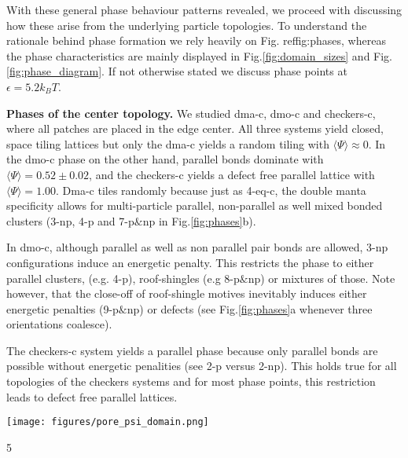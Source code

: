 \documentclass[a4paper,twocolumn]{revtex4}
\begin{document}
With these general phase behaviour patterns revealed, we proceed with discussing how these arise from the underlying particle topologies.
To understand the rationale behind phase formation we rely heavily on Fig. ref{fig:phases}, whereas the phase characteristics are mainly displayed in Fig.\ref{fig:domain_sizes} and Fig.\ref{fig:phase_diagram}. 
If not otherwise stated we discuss phase points at $\epsilon=5.2 k_{B}T$.

\textbf{Phases of the center topology.}
We studied dma-c, dmo-c and checkers-c, where all patches are placed in the edge center.
All three systems yield closed, space tiling lattices but only the dma-c yields a random tiling with $\langle\Psi\rangle\approx 0$.
In the dmo-c phase on the other hand, parallel bonds dominate with $\langle\Psi\rangle=0.52\pm 0.02$, and the checkers-c yields a defect free parallel lattice with $\langle\Psi\rangle = 1.00$. 
Dma-c tiles randomly because just as 4-eq-c, the double manta specificity allows for multi-particle parallel, non-parallel as well mixed bonded clusters (3-np, 4-p and 7-p$\&$np in Fig.\ref{fig:phases}b).

In dmo-c, although parallel as well as non parallel pair bonds are allowed, 3-np configurations induce an energetic penalty. This restricts the phase to either parallel clusters, (e.g. 4-p), roof-shingles (e.g 8-p$\&$np) or mixtures of those. 
Note however, that the close-off of roof-shingle motives 
inevitably induces either energetic penalties (9-p$\&$np) or defects (see Fig.\ref{fig:phases}a whenever three orientations coalesce). 

The checkers-c system yields a parallel phase because only parallel bonds are possible without energetic penalities (see 2-p 
versus 2-np). 
This holds true for all topologies of the checkers systems and 
for most phase points, this restriction leads to defect free parallel lattices. 



\begin{figure*}
\begin{center} 
\texttt{[image: figures/pore\_psi\_domain.png]}
\caption{}5
\label{fig:domain_sizes}
\end{center} 
\end{figure*}

\end{document}
